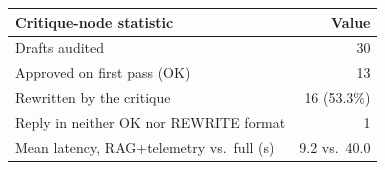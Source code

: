 \begin{tabular}{@{}lr@{}}
\toprule
Critique-node statistic & Value \\
\midrule
Drafts audited & 30 \\
Approved on first pass (OK) & 13 \\
Rewritten by the critique & 16 (53.3\%) \\
Reply in neither OK nor REWRITE format & 1 \\
Mean latency, RAG+telemetry vs.\ full (s) & 9.2 vs.\ 40.0 \\
\bottomrule
\end{tabular}